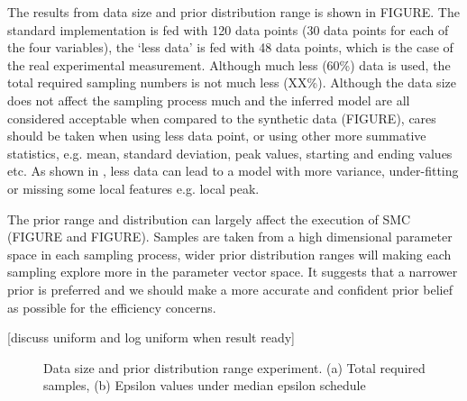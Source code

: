 The results from data size and prior distribution range is shown in FIGURE. The standard implementation is fed with 120 data points (30 data points for each of the four variables), the `less data' is fed with 48 data points, which is the case of the real experimental measurement. Although much less (60\%) data is used, the total required sampling numbers is not much less (XX\%). Although the data size does not affect the sampling process much and the inferred model are all considered acceptable when compared to the synthetic data (FIGURE), cares should be taken when using less data point, or using other more summative statistics, e.g. mean, standard deviation, peak values, starting and ending values etc. As shown in \cite{ref:disease}, less data can lead to a model with more variance, under-fitting or missing some local features e.g. local peak.

The prior range and distribution can largely affect the execution of SMC (FIGURE and FIGURE). Samples are taken from a high dimensional parameter space in each sampling process, wider prior distribution ranges will making each sampling explore more in the parameter vector space. It suggests that a narrower prior is preferred and we should make a more accurate and confident prior belief as possible for the efficiency concerns.

    [discuss uniform and log uniform when result ready]

\begin{figure}
    \begin{center}
    \end{center}

    \caption[Data size and prior distribution range experiment]%
    {Data size and prior distribution range experiment. (a) Total required samples, (b) Epsilon values under median epsilon schedule}
    \label{fig:size}

\end{figure}

